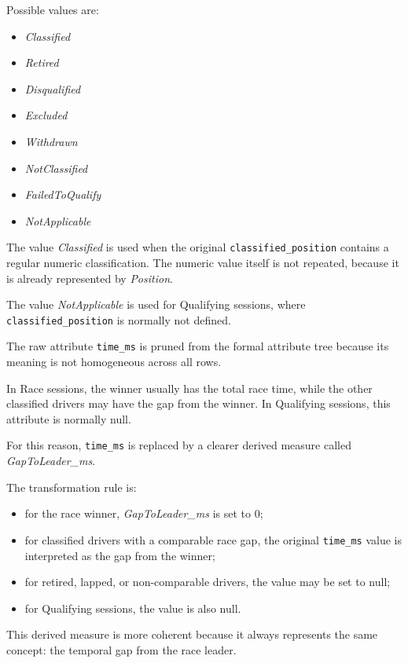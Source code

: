 \documentclass[a4paper,11pt]{article}
\begin{document}
	Possible values are:
	
	\begin{itemize}
		\item \textit{Classified}
		\item \textit{Retired}
		\item \textit{Disqualified}
		\item \textit{Excluded}
		\item \textit{Withdrawn}
		\item \textit{NotClassified}
		\item \textit{FailedToQualify}
		\item \textit{NotApplicable}
	\end{itemize}
	
	The value \textit{Classified} is used when the original \texttt{classified\_position}
	contains a regular numeric classification. The numeric value itself is not repeated,
	because it is already represented by \textit{Position}.
	
	The value \textit{NotApplicable} is used for Qualifying sessions, where
	\texttt{classified\_position} is normally not defined.
	
	
	The raw attribute \texttt{time\_ms} is pruned from the formal attribute tree because its
	meaning is not homogeneous across all rows.
	
	In Race sessions, the winner usually has the total race time, while the other classified
	drivers may have the gap from the winner. In Qualifying sessions, this attribute is
	normally null.
	
	For this reason, \texttt{time\_ms} is replaced by a clearer derived measure called
	\textit{GapToLeader\_ms}.
	
	The transformation rule is:
	
	\begin{itemize}
		\item for the race winner, \textit{GapToLeader\_ms} is set to 0;
		\item for classified drivers with a comparable race gap, the original
		\texttt{time\_ms} value is interpreted as the gap from the winner;
		\item for retired, lapped, or non-comparable drivers, the value may be set to null;
		\item for Qualifying sessions, the value is also null.
	\end{itemize}
	
	This derived measure is more coherent because it always represents the same concept:
	the temporal gap from the race leader.
	
\end{document}
